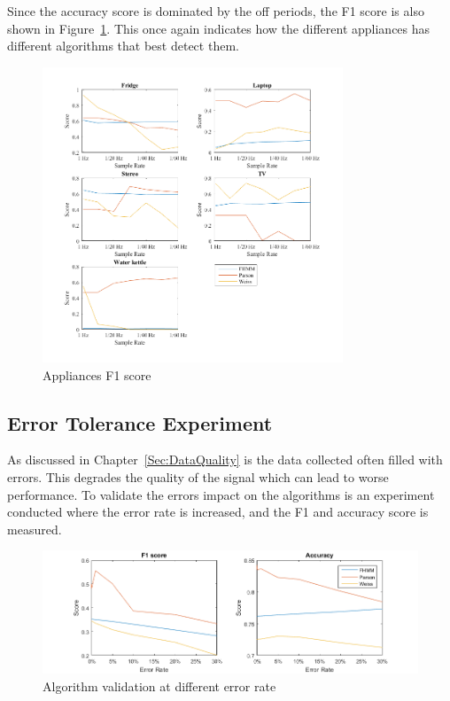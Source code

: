 Since the accuracy score is dominated by the off periods, the F1 score is also shown in Figure~\ref{fig:AppF1}. This once again indicates how the different appliances has different algorithms that best detect them.  


\begin{figure}[H]
\centering
\includegraphics[width=0.8\textwidth]{billeder/App-F1Score.png}
\caption{Appliances F1 score}
\label{fig:AppF1}
\end{figure}

\newpage

\subsection{Error Tolerance Experiment}
\label{Sec:ETE}
As discussed in Chapter~\ref{Sec:DataQuality} is the data collected often filled with errors. This degrades the quality of the signal which can lead to worse performance. To validate the errors impact on the algorithms is an experiment conducted where the error rate is increased, and the F1 and accuracy score is measured. 

\begin{figure}[H]
\centering
\includegraphics[width=1\textwidth]{billeder/AlgoErrorRate.png}
\caption{Algorithm validation at different error rate}
\label{fig:ErrorEx}
\end{figure}

